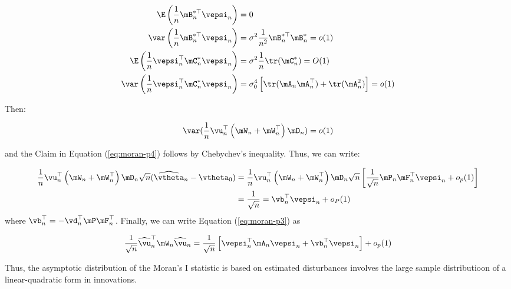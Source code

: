 \documentclass[english,12pt]{book}\usepackage[]{graphicx}\usepackage[]{xcolor}
\begin{document}
\begin{subappendices}
\begin{equation*}
  \begin{aligned}
    \E\left(\frac{1}{n}\mB^{*\top}_n\vepsi_n\right) &= 0 \\
    \var\left(\frac{1}{n}\mB^{*\top}_n\vepsi_n\right) &= \sigma^2\frac{1}{n^2}\mB^{*\top}_n\mB^{*}_n = o(1) \\
    \E\left(\frac{1}{n}\vepsi_n^\top\mC^*_n\vepsi_n\right) &= \sigma^2\frac{1}{n}\tr(\mC_n^*) = O(1)\\
     \var\left(\frac{1}{n}\vepsi_n^\top\mC^*_n\vepsi_n\right) &= \sigma^4_0\left[\tr(\mA_n\mA_n^\top)+\tr(\mA^2_n)\right] = o(1)
  \end{aligned}
\end{equation*}

Then:

\begin{equation}
  \var(\frac{1}{n}\vu_n^\top\left(\mW_n + \mW_n^\top\right)\mD_n) = o(1)
\end{equation}

and the Claim in Equation (\ref{eq:moran-p4}) follows by Chebychev's inequality. Thus, we can write:


\begin{equation}
\begin{aligned}
\frac{1}{n}\vu_n^\top\left(\mW_n + \mW_n^\top\right)\mD_n\sqrt{n}(\widehat{\vtheta}_n - \vtheta_0) & =  \frac{1}{n}\vu_n^\top\left(\mW_n + \mW_n^\top\right)\mD_n\sqrt{n}\left[\frac{1}{\sqrt{n}}\mP_n\mF_n^\top\vepsi_n + o_p(1)\right] \\
& = \frac{1}{\sqrt{n}} = \vb_n^\top\vepsi_n + o_P(1)
\end{aligned}
\end{equation}
%
where $\vb_n^\top = -\vd_n^\top\mP\mF_n^\top$. Finally, we can write Equation (\ref{eq:moran-p3}) as

\begin{equation}
\frac{1}{\sqrt{n}}\widehat{\vu}_n^\top\mW_n\widehat{\vu}_n =\frac{1}{\sqrt{n}}\left[\vepsi_n^\top\mA_n\vepsi_n + \vb_n^\top\vepsi_n\right] + o_p(1)
\end{equation}

Thus, the asymptotic distribution of the Moran's I statistic is based on estimated disturbances involves the large sample distributioon of a linear-quadratic form in innovations. 


\end{subappendices}



\end{document}
